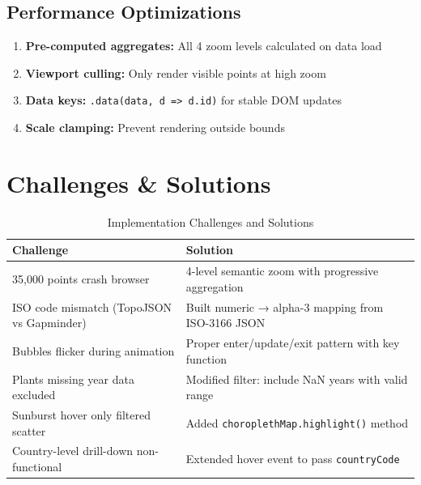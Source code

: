 \documentclass[11pt,a4paper]{article}
\begin{document}
\subsection{Performance Optimizations}
\begin{enumerate}[noitemsep]
    \item \textbf{Pre-computed aggregates:} All 4 zoom levels calculated on data load
    \item \textbf{Viewport culling:} Only render visible points at high zoom
    \item \textbf{Data keys:} \texttt{.data(data, d => d.id)} for stable DOM updates
    \item \textbf{Scale clamping:} Prevent rendering outside bounds
\end{enumerate}

\section{Challenges \& Solutions}

\begin{table}[H]
\centering
\begin{tabular}{@{}p{5cm}p{9cm}@{}}
\toprule
\textbf{Challenge} & \textbf{Solution} \\
\midrule
35,000 points crash browser & 4-level semantic zoom with progressive aggregation \\
ISO code mismatch (TopoJSON vs Gapminder) & Built numeric → alpha-3 mapping from ISO-3166 JSON \\
Bubbles flicker during animation & Proper enter/update/exit pattern with key function \\
Plants missing year data excluded & Modified filter: include NaN years with valid range \\
Sunburst hover only filtered scatter & Added \texttt{choroplethMap.highlight()} method \\
Country-level drill-down non-functional & Extended hover event to pass \texttt{countryCode} \\
\bottomrule
\end{tabular}
\caption{Implementation Challenges and Solutions}
\end{table}

\end{document}

